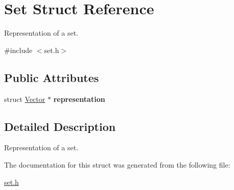 \hypertarget{structSet}{}\section{Set Struct Reference}
\label{structSet}


Representation of a set.  




{\ttfamily \#include $<$set.\+h$>$}

\subsection*{Public Attributes}
\begin{DoxyCompactItemize}
\item 
\mbox{\label{structSet_adee3ec7b97b7c8907664e41219e58844}} 
struct \hyperlink{structVector}{Vector} $\ast$ {\bfseries representation}
\end{DoxyCompactItemize}


\subsection{Detailed Description}
Representation of a set. 

The documentation for this struct was generated from the following file\+:\begin{DoxyCompactItemize}
\item 
\hyperlink{set_8h}{set.\+h}\end{DoxyCompactItemize}
